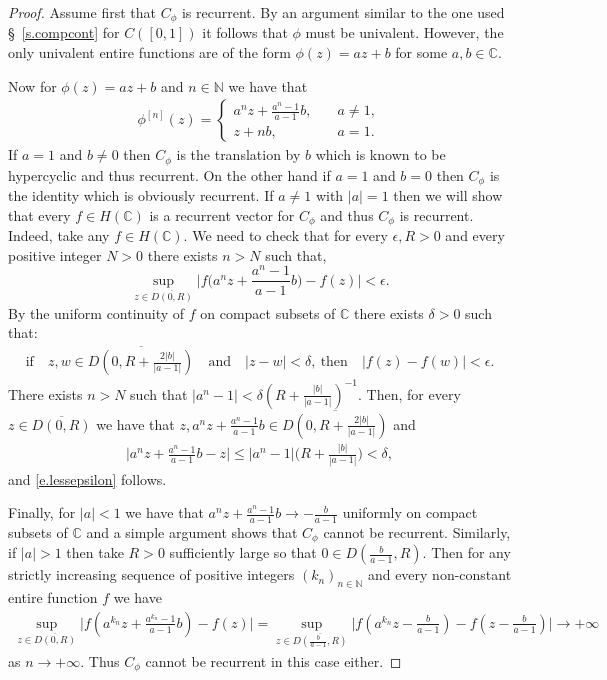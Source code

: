 \documentclass[12pt,leqno]{amsart}
\theoremstyle{plain}
\theoremstyle{definition}
\numberwithin{equation}{section}
\begin{document}
\begin{proof}
	Assume first that $C_\phi$ is recurrent. By an argument similar to the one used \S~\ref{s.compcont} for $C([0,1])$ it follows that $\phi$ must be univalent. However, the only univalent entire functions are of the form $\phi(z)=az+b$ for some $a,b\in\mathbb C$.
	
	Now for $\phi(z)=az+b$ and $n\in \mathbb N$ we have that 
	\begin{align*}
		\phi^{[n]}(z)= 
		\begin{cases}
			a^nz+\frac{a^n-1}{a-1}b, \quad &a\neq 1,\\
			z+nb,\quad &a=1 . 
		\end{cases}
	\end{align*}
	If $a=1$ and $b\neq 0$ then $C_\phi$ is the translation by $b$ which is known to be hypercyclic and thus recurrent. On the other hand if $a=1$ and $b=0$ then $C_\phi$ is the identity which is obviously recurrent. If $a\neq 1$ with $|a|=1$ then we will show that every $f\in H(\mathbb C)$ is a recurrent vector for $C_\phi$ and thus $C_\phi$ is recurrent. Indeed, take any $f\in H(\mathbb C)$. We need to check that for every $\epsilon,R>0$ and every positive integer $N>0$ there exists $n>N$ such that, 
	\begin{equation}
		\label{e.lessepsilon} \sup_{z\in \overline{D(0,R)}} {\biggl\lvert{f\big(a^nz+\frac{a^n-1}{a-1}b\big)-f(z)}\biggr\rvert}<\epsilon. 
	\end{equation}
	By the uniform continuity of $f$ on compact subsets of $\mathbb C$ there exists $\delta>0$ such that: 
	\begin{align*}
		\text{if}\quad z,w\in \overline{D\left(0,R+\frac{2|b|}{|a-1|}\right)}\quad \text{and}\quad |z-w|<\delta,\ \text{then}\quad{\bigl\lvert{f(z)-f(w)}\bigr\rvert}<\epsilon. 
	\end{align*}
	There exists $n>N$ such that $|a^n-1|<{\delta}{(R+\frac{|b|}{|a-1|})^{-1}}.$ Then, for every $z\in \overline{D(0,R)}$ we have that $z,a^nz+\frac{a^n-1}{a-1}b\in \overline{D(0,R+\frac{2|b|}{|a-1|})}$ and 
	\begin{align*}
		{\biggl\lvert{a^nz+\frac{a^n-1}{a-1}b -z }\biggr\rvert}\leq |a^n-1|\big( R+ \frac{|b|}{|a-1|}\big)<\delta, 
	\end{align*}
	and \eqref{e.lessepsilon} follows.
	
	Finally, for $|a|<1$ we have that $a^nz+\frac{a^n-1}{a-1}b \to -\frac{b}{a-1}$ uniformly on compact subsets of $\mathbb C$ and a simple argument shows that $C_\phi$ cannot be recurrent. Similarly, if $|a|>1 $ then take $R>0$ sufficiently large so that $0\in D(\frac{b}{a-1},R)$. Then for any strictly increasing sequence of positive integers $(k_n)_{n\in\mathbb N}$ and every non-constant entire function $f$ we have 
	\begin{align*}
		\sup_{z\in\overline{D(0,R)}}{\biggl\lvert{f(a^{k_n}z+\frac{a^{k_n}-1}{a-1}b)-f(z)}\biggr\rvert}=\sup_{z\in \overline{D(\frac{b}{a-1},R)}}{\bigl\lvert{f(a^{k_n}z-\frac{b}{a-1})-f(z-\frac{b}{a-1})}\bigr\rvert}\to+\infty 
	\end{align*}
	as $n\to+\infty$. Thus $C_\phi$ cannot be recurrent in this case either. 
\end{proof}
\end{document}

